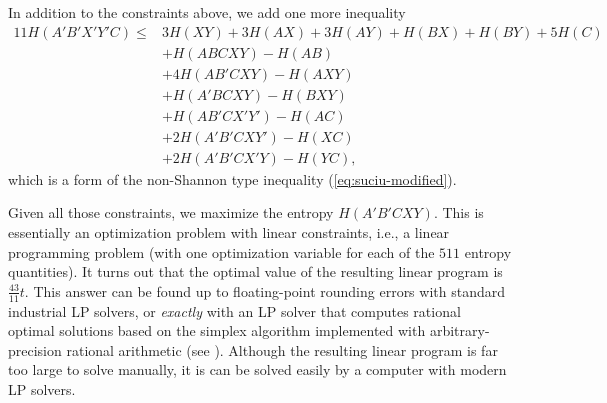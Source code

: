 \documentclass[a4paper,cleveref]{lipics-v2021}
\begin{document}
In addition to the constraints above, we add one more inequality
\begin{align*}
	11 H(A'B'X'Y'C) \le &3 H(XY) + 3H(AX) + 3H(AY) +H(BX) + H(BY) + 5H(C) \\
	& + H(ABCXY) - H(AB) \\
	& + 4H(AB'CXY)  - H(AXY)\\
	& + H(A'BCXY) - H(BXY) \\
	&+ H(AB'CX'Y') - H(AC)\\
	& + 2H(A'B'CXY')  - H(XC)\\
	&  + 2H(A'B'CX'Y) - H(YC),
\end{align*}
which is a form of the non-Shannon type inequality (\ref{eq:suciu-modified}).

Given all those constraints, we maximize the entropy $H(A'B'CXY)$.
This is essentially an optimization problem with linear constraints, i.e., a linear programming problem
(with one  optimization variable  for each of the $511$ entropy quantities).
It turns out that the optimal value of the resulting linear program is
\(
 \frac{43}{11} t.
\)
This answer can be found up to floating-point rounding errors with standard industrial LP solvers, 
or \emph{exactly} with an LP solver that 
computes rational optimal solutions
based on the simplex algorithm implemented with arbitrary-precision rational arithmetic
%
(see \cite{applegate2007exact}).
Although the resulting linear program is far too large to solve manually, it is can be solved easily by a computer with modern LP solvers.
\end{document}

